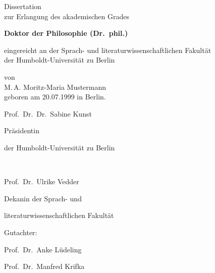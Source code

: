 \begin{center}
\begin{minipage}{.99\textwidth}
\begin{center}
	\end{center}
\end{minipage}


\vspace{1.4cm}


\begin{minipage}{.99\textwidth}
\centering
	Dissertation\\
	zur Erlangung des akademischen Grades 


\vspace{.3cm}


	\textbf{Doktor der Philosophie (Dr.\ phil.)}


\vspace{.3cm}


	eingereicht an der Sprach- und literaturwissenschaftlichen Fakultät\\
	der Humboldt-Universität zu Berlin


\vspace{.5cm}


	von\\
	M.\,A. Moritz-Maria Mustermann\\
	geboren am 20.07.1999 in Berlin.
\end{minipage}


\vspace{.9cm}


\begin{minipage}[][][t]{.99\textwidth}
\centering	
	\begin{minipage}[][][t]{.48\textwidth}
	Prof.\ Dr.\ Dr.\ Sabine Kunst
	
	Präsidentin
	
	der Humboldt-Universität zu Berlin
	\end{minipage} 
%
	\begin{minipage}[][][t]{.03\textwidth}
	~
	\end{minipage}	
%
	\begin{minipage}[][][t]{.46\textwidth}
		Prof.\ Dr.\ Ulrike Vedder
		
		Dekanin
		der Sprach- und 
		
		literaturwissenschaftlichen Fakultät
	\end{minipage}
\end{minipage}


\vspace{.5cm}


\begin{minipage}{.99\textwidth}

	Gutachter:

	\begin{enumerate*}
		\item Prof.\ Dr.\ Anke Lüdeling
		\item Prof.\ Dr.\ Manfred Krifka
	\end{enumerate*}

\end{minipage}


\end{center}